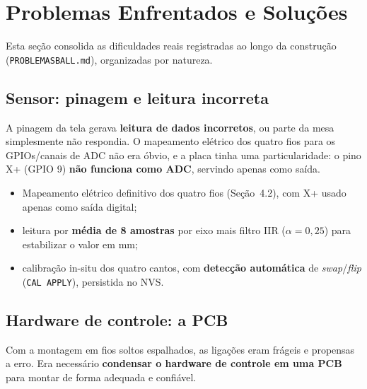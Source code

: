 \documentclass[11pt,a4paper,oneside]{article}
\begin{document}
\section{Problemas Enfrentados e Soluções}

Esta seção consolida as dificuldades reais registradas ao longo da construção
(\texttt{PROBLEMASBALL.md}), organizadas por natureza.

\subsection{Sensor: pinagem e leitura incorreta}

\begin{problembox}
A pinagem da tela gerava \textbf{leitura de dados incorretos}, ou parte da mesa
simplesmente não respondia. O mapeamento elétrico dos quatro fios para os
GPIOs/canais de ADC não era óbvio, e a placa tinha uma particularidade: o pino
X+ (GPIO 9) \textbf{não funciona como ADC}, servindo apenas como saída.
\end{problembox}

\begin{solutionbox}
\begin{itemize}
  \item Mapeamento elétrico definitivo dos quatro fios (Seção~4.2), com X+ usado
  apenas como saída digital;
  \item leitura por \textbf{média de 8 amostras} por eixo mais filtro IIR
  ($\alpha=0{,}25$) para estabilizar o valor em mm;
  \item calibração in-situ dos quatro cantos, com \textbf{detecção automática}
  de \emph{swap}/\emph{flip} (\texttt{CAL APPLY}), persistida no NVS.
\end{itemize}
\end{solutionbox}

\subsection{Hardware de controle: a PCB}

\begin{problembox}
Com a montagem em fios soltos espalhados, as ligações eram frágeis e propensas a
erro. Era necessário \textbf{condensar o hardware de controle em uma PCB} para
montar de forma adequada e confiável.
\end{problembox}
\end{document}
